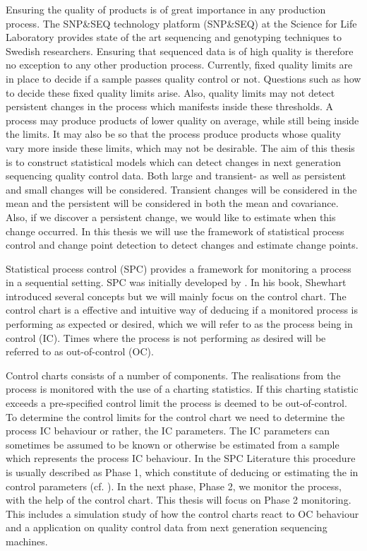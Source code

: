 Ensuring the quality of products is of great importance in any production process. The SNP\&SEQ technology platform (SNP\&SEQ) at the Science for Life Laboratory provides state of the art sequencing and genotyping techniques to Swedish researchers. Ensuring that sequenced data is of high quality is therefore no exception to any other production process. Currently, fixed quality limits are in place to decide if a sample passes quality control or not. Questions such as how to decide these fixed quality limits arise. Also, quality limits may not detect persistent changes in the process which manifests inside these thresholds. A process may produce products of lower quality on average, while still being inside the limits. It may also be so that the process produce products whose quality vary more inside these limits, which may not be desirable. The aim of this thesis is to construct statistical models which can detect changes in next generation sequencing quality control data. Both large and transient- as well as persistent and small changes will be considered. Transient changes will be considered in the mean and the persistent will be considered in both the mean and covariance. Also, if we discover a persistent change, we would like to estimate when this change occurred. In this thesis we will use the framework of statistical process control and change point detection to detect changes and estimate change points.

Statistical process control (SPC) provides a framework for monitoring a process in a sequential setting. SPC was initially developed by \citet{WS}. In his book, Shewhart introduced several concepts but we will mainly focus on the control chart. The control chart is a effective and intuitive way of deducing if a monitored process is performing as expected or desired, which we will refer to as the process being in control (IC). Times where the process is not performing as desired will be referred to as out-of-control (OC). 

Control charts consists of a number of components. The realisations from the process is monitored with the use of a charting statistics. If this charting statistic exceeds a pre-specified control limit the process is deemed to be out-of-control. To determine the control limits for the control chart we need to determine the process IC behaviour or rather, the IC parameters. The IC parameters can sometimes be assumed to be known or otherwise be estimated from a sample which represents the process IC behaviour. In the SPC Literature this procedure is usually described as Phase 1, which constitute of deducing or estimating the in control parameters (cf. \citet{Phase1}). In the next phase, Phase 2, we monitor the process, with the help of the control chart. This thesis will focus on Phase 2 monitoring. This includes a simulation study of how the control charts react to OC behaviour and a application on quality control data from next generation sequencing machines. %

